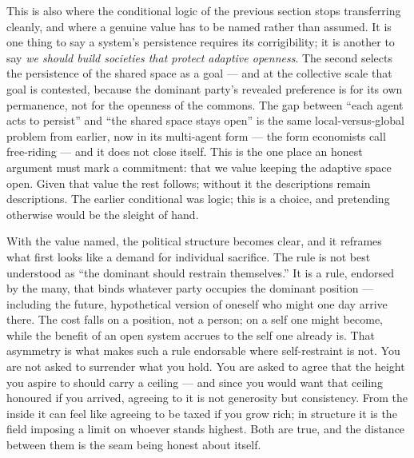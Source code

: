\documentclass[11pt, a4paper]{report}
\begin{document}
This is also where the conditional logic of the previous section stops transferring cleanly, and where a genuine value has to be named rather than assumed. It is one thing to say a system's persistence requires its corrigibility; it is another to say \textit{we should build societies that protect adaptive openness}. The second selects the persistence of the shared space as a goal --- and at the collective scale that goal is contested, because the dominant party's revealed preference is for its own permanence, not for the openness of the commons. The gap between ``each agent acts to persist'' and ``the shared space stays open'' is the same local-versus-global problem from earlier, now in its multi-agent form --- the form economists call free-riding --- and it does not close itself. This is the one place an honest argument must mark a commitment: that we value keeping the adaptive space open. Given that value the rest follows; without it the descriptions remain descriptions. The earlier conditional was logic; this is a choice, and pretending otherwise would be the sleight of hand.

With the value named, the political structure becomes clear, and it reframes what first looks like a demand for individual sacrifice. The rule is not best understood as ``the dominant should restrain themselves.'' It is a rule, endorsed by the many, that binds whatever party occupies the dominant position --- including the future, hypothetical version of oneself who might one day arrive there. The cost falls on a position, not a person; on a self one might become, while the benefit of an open system accrues to the self one already is. That asymmetry is what makes such a rule endorsable where self-restraint is not. You are not asked to surrender what you hold. You are asked to agree that the height you aspire to should carry a ceiling --- and since you would want that ceiling honoured if you arrived, agreeing to it is not generosity but consistency. From the inside it can feel like agreeing to be taxed if you grow rich; in structure it is the field imposing a limit on whoever stands highest. Both are true, and the distance between them is the seam being honest about itself.
\end{document}

